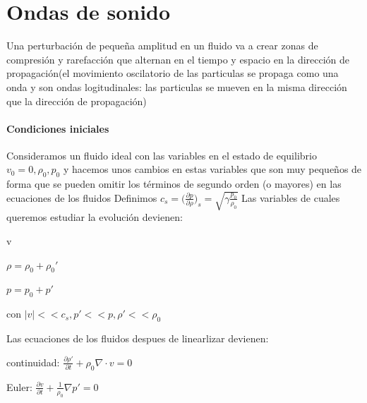 \documentclass{article}
\begin{document}
\section{Ondas de sonido}
Una perturbación de pequeña amplitud en un fluido va a crear zonas de compresión y rarefacción que alternan en el tiempo y espacio en la dirección de propagación(el movimiento oscilatorio de las particulas se propaga como una onda y son ondas logitudinales:  las particulas se mueven en la misma dirección que la dirección de propagación)

\paragraph{Condiciones iniciales}
Consideramos un fluido ideal con las variables en el estado de equilibrio $v_0 = 0, \rho_0 , p_0$ y hacemos unos cambios en estas variables que  son muy pequeños de forma que se pueden omitir los términos de segundo orden (o mayores) en las ecuaciones de los fluidos
Definimos $c_s = \big( \frac{\partial p}{\partial \rho}\big)_s = \sqrt{\gamma \frac{p_0}{\rho_0}}$
Las variables de cuales queremos estudiar la evolución devienen:

\begin{description}  
\item v
\item $\rho = \rho_0 + \rho_0\prime$
\item $p = p_0 + p\prime$

 
\end{description}  

con $|v|<<c_s, p\prime<<p , \rho\prime << \rho_0$ 

Las ecuaciones de los fluidos despues de linearlizar devienen:
\begin{description}  
\item continuidad: $ \frac{\partial \rho\prime}{\partial t} + \rho_0 \nabla \cdot v = 0 $
\item Euler: $ \frac{\partial v}{\partial t} + \frac{1}{\rho_0} \nabla p\prime = 0 $

\end{description}  
\end{document}
